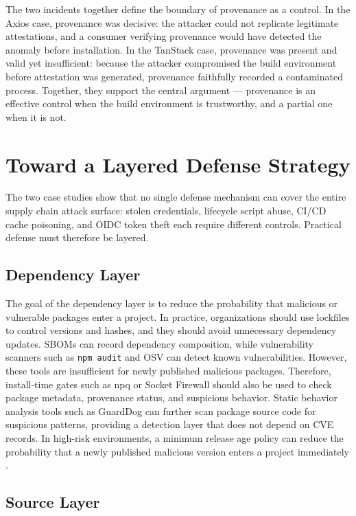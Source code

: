 \documentclass[12pt,a4paper]{article}
\begin{document}
The two incidents together define the boundary of provenance as a control. In the Axios case, provenance was decisive: the attacker could not replicate legitimate attestations, and a consumer verifying provenance would have detected the anomaly before installation. In the TanStack case, provenance was present and valid yet insufficient: because the attacker compromised the build environment before attestation was generated, provenance faithfully recorded a contaminated process. Together, they support the central argument --- provenance is an effective control when the build environment is trustworthy, and a partial one when it is not.

\section{Toward a Layered Defense Strategy}

The two case studies show that no single defense mechanism can cover the entire supply chain attack surface: stolen credentials, lifecycle script abuse, CI/CD cache poisoning, and OIDC token theft each require different controls. Practical defense must therefore be layered.

\subsection{Dependency Layer}

The goal of the dependency layer is to reduce the probability that malicious or vulnerable packages enter a project. In practice, organizations should use lockfiles to control versions and hashes, and they should avoid unnecessary dependency updates. SBOMs can record dependency composition, while vulnerability scanners such as \texttt{npm audit} and OSV \cite{osv} can detect known vulnerabilities. However, these tools are insufficient for newly published malicious packages. Therefore, install-time gates such as npq \cite{npq} or Socket Firewall \cite{socket-firewall} should also be used to check package metadata, provenance status, and suspicious behavior. Static behavior analysis tools such as GuardDog \cite{guarddog} can further scan package source code for suspicious patterns, providing a detection layer that does not depend on CVE records. In high-risk environments, a minimum release age policy can reduce the probability that a newly published malicious version enters a project immediately \cite{openai-tanstack}.

\subsection{Source Layer}
\end{document}
